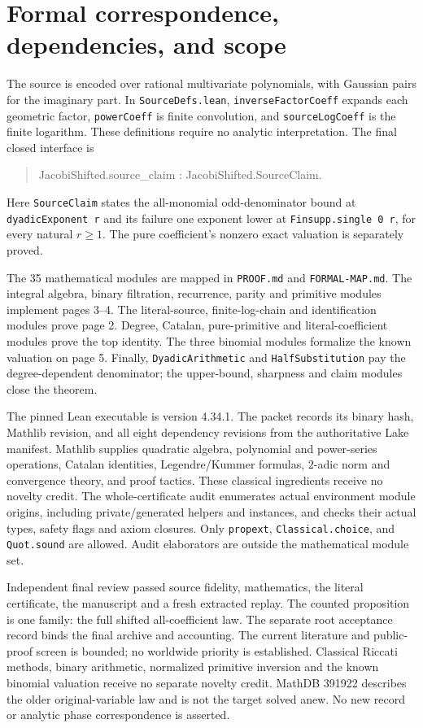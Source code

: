 \documentclass[11pt]{article}
\begin{document}
\newpage
\section{Formal correspondence, dependencies, and scope}
The source is encoded over rational multivariate polynomials, with Gaussian pairs for the imaginary part. In \texttt{SourceDefs.lean}, \texttt{inverseFactorCoeff} expands each geometric factor, \texttt{powerCoeff} is finite convolution, and \texttt{sourceLogCoeff} is the finite logarithm. These definitions require no analytic interpretation. The final closed interface is
\begin{quote}\ttfamily
 JacobiShifted.source\_claim : JacobiShifted.SourceClaim.
\end{quote}
Here \texttt{SourceClaim} states the all-monomial odd-denominator bound at \texttt{dyadicExponent r} and its failure one exponent lower at \texttt{Finsupp.single 0 r}, for every natural $r\ge1$. The pure coefficient's nonzero exact valuation is separately proved.

The 35 mathematical modules are mapped in \texttt{PROOF.md} and \texttt{FORMAL-MAP.md}. The integral algebra, binary filtration, recurrence, parity and primitive modules implement pages 3--4. The literal-source, finite-log-chain and identification modules prove page 2. Degree, Catalan, pure-primitive and literal-coefficient modules prove the top identity. The three binomial modules formalize the known valuation on page 5. Finally, \texttt{DyadicArithmetic} and \texttt{HalfSubstitution} pay the degree-dependent denominator; the upper-bound, sharpness and claim modules close the theorem.

The pinned Lean executable is version 4.34.1. The packet records its binary hash, Mathlib revision, and all eight dependency revisions from the authoritative Lake manifest. Mathlib supplies quadratic algebra, polynomial and power-series operations, Catalan identities, Legendre/Kummer formulas, $2$-adic norm and convergence theory, and proof tactics. These classical ingredients receive no novelty credit. The whole-certificate audit enumerates actual environment module origins, including private/generated helpers and instances, and checks their actual types, safety flags and axiom closures. Only \texttt{propext}, \texttt{Classical.choice}, and \texttt{Quot.sound} are allowed. Audit elaborators are outside the mathematical module set.

Independent final review passed source fidelity, mathematics, the literal certificate, the manuscript and a fresh extracted replay. The counted proposition is one family: the full shifted all-coefficient law. The separate root acceptance record binds the final archive and accounting. The current literature and public-proof screen is bounded; no worldwide priority is established. Classical Riccati methods, binary arithmetic, normalized primitive inversion and the known binomial valuation receive no separate novelty credit. MathDB 391922 describes the older original-variable law and is not the target solved anew. No new record or analytic phase correspondence is asserted.
\end{document}
